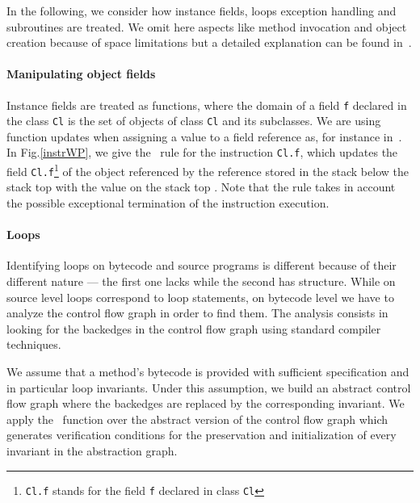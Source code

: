 In the following, we consider how instance fields, 
loops exception handling and subroutines are treated. We omit here aspects like method invocation and object creation because of space limitations but a detailed explanation can be found in~\cite{JBL05MP}. 

\paragraph{Manipulating object fields}
Instance fields are treated as functions, where the domain of a field \texttt{f} 
declared in the class \texttt{Cl} is the set of objects of class \texttt{Cl} and its subclasses.
We are using function updates when assigning a value to a field reference as, for instance in~\cite{B00ppp}.
In Fig.\ref{instrWP}, we give the \wpi \ rule for the
instruction  \texttt{Cl.f}, which updates the field \texttt{Cl.f}\footnote{ \texttt{Cl.f} stands for the field \texttt{f} declared in class 
\texttt{Cl}} of the object referenced by the reference stored in the stack below the stack top  with the value on the stack top \stack{\counter}.
Note that the rule takes in account the possible exceptional termination of the instruction execution.


\paragraph*{Loops}

Identifying loops on bytecode and source programs is different because of their different nature --- 
the first one lacks while the second has structure. While on source level loops correspond to loop statements,  
on bytecode level we have to analyze the control flow graph in order to find them.
 The analysis consists in looking for the backedges in the control flow graph using standard compiler techniques. 
  
 We assume that a method's bytecode is provided with sufficient specification and in particular loop invariants.
 Under this assumption, we build an abstract control flow graph where the backedges are replaced by
 the corresponding invariant. We apply the \wpi \ function over the abstract version of the control flow graph which generates verification conditions for the 
preservation and initialization of every invariant in the abstraction graph. 


     

